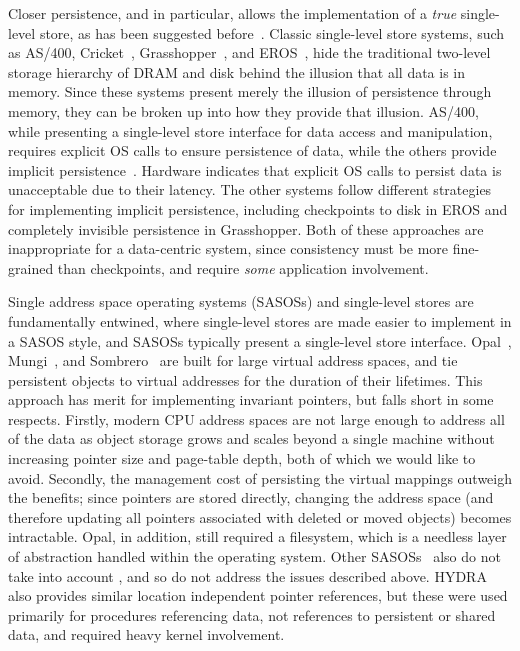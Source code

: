 Closer persistence, and \NVM in particular, allows the implementation of a \textit{true}
single-level store, as has been suggested before~\cite{bailey:hotos11}.
Classic single-level store systems, such as AS/400, Cricket~\cite{shekita:uwtr956},
Grasshopper~\cite{dearli:cs94}, and
EROS~\cite{shapiro:usenix02}, hide the traditional two-level storage hierarchy of DRAM and disk
behind the illusion that all data is in memory. Since these systems present merely the illusion of persistence
through memory, they can be broken up into how they provide that illusion. AS/400, while presenting
a single-level store interface for data access and manipulation, requires explicit OS calls to
ensure persistence of data, while the others provide implicit persistence~\cite{dearli:cs94}.
Hardware indicates that explicit OS calls to persist data is unacceptable
due to their latency. The other systems follow different strategies for implementing implicit
persistence, including checkpoints to disk in EROS and completely invisible persistence in
Grasshopper. Both of these approaches are inappropriate for a data-centric system, since consistency must be more
fine-grained than checkpoints, and require \emph{some} application involvement.

Single address space operating systems (SASOSs) and single-level stores are fundamentally entwined,
where single-level stores are made easier to implement in a SASOS style, and SASOSs typically
present a single-level store interface. Opal~\cite{chase:sosp01}, Mungi~\cite{heiser:scse9314}, and
Sombrero~\cite{miller:osr00} are built for large virtual address spaces, and tie persistent objects
to virtual addresses for the duration of their lifetimes. This approach has merit for implementing
invariant pointers, but falls short in some respects. Firstly, modern
CPU address spaces are not large enough to address all of the data as object storage grows and
scales beyond a single machine without increasing pointer size and page-table depth, both of which
we would like to avoid. Secondly, the management cost of persisting the virtual mappings
outweigh the benefits; since pointers are stored directly, changing the address space (and
therefore updating all pointers associated with deleted or moved objects) becomes intractable.
Opal, in addition, still required a filesystem, which is a needless layer of abstraction handled
within the operating system. Other
SASOSs~\cite{roscoe:osr94,heiser:scse9314,miller:osr00} also do not take into account \NVM, and so
do not address the issues described above.
HYDRA~\cite{wulf:cacm74} also provides similar location independent pointer references, but these
were used primarily for procedures referencing data, not references to persistent or shared data, and required
heavy kernel involvement.

